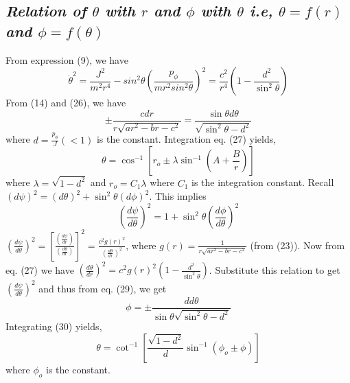 \documentclass[conference]{IEEEtran}
\begin{document}
\subsection{\emph{\textbf{Relation of $\theta$ with $r$ and $\phi$ with $\theta$ i.e, $\theta = f(r)$ and $\phi = f(\theta)$}}}
From expression (9), we have \begin{dmath}\dot{\theta}^{2} =  \frac{J^2}{m^{2}r^{4}} - sin^{2}{\theta}\left(\frac{p_{\phi}}{mr^{2}sin^{2}{\theta}}\right)^{2} = \frac{c^{2}}{r^{4}}\left(1 - \frac{d^{2}}{\sin^{2}{\theta}}\right)\end{dmath} From (14) and (26), we have \begin{dmath}\pm \frac{c dr}{r\sqrt{ar^{2} - br - c^{2}}} = \frac{\sin{\theta} d\theta}{\sqrt{\sin^{2}{\theta} - d^{2}}}\end{dmath} where $d = \frac{p_{\phi}}{J} \left( < 1\right)$ is the constant. Integration eq. (27) yields, \begin{dmath} \theta = \cos^{-1}{\left[r_{o} \pm \lambda\sin^{-1}{\left(A + \frac{B}{r}\right)}\right]}\end{dmath} where $\lambda = \sqrt{1 - d^{2}}$ and $r_{o} = C_{1}\lambda$ where $C_{1}$ is the integration constant. 
Recall $\left(d\psi\right)^{2} = \left(d\theta\right)^{2} + \sin^{2}{\theta}\left(d\phi\right)^{2}$. This implies \begin{dmath}\left(\frac{d\psi}{d \theta}\right)^{2} = 1 + \sin^{2}{\theta}\left(\frac{d\phi}{d \theta}\right)^{2}\end{dmath} 
$\left(\frac{d\psi}{d \theta}\right)^{2} = \left[\frac{\left(\frac{d\psi}{d r}\right)}{\left(\frac{d\theta}{d r}\right)}\right]^{2} = \frac{c^{2}g(r)^{2}}{\left(\frac{d\theta}{d r}\right)^{2}}$, where $g(r) = \frac{1}{r\sqrt{ar^{2} - br - c^{2}}}$ (from (23)). Now from eq. (27) we have $\left(\frac{d\theta}{d r}\right)^{2} = c^{2}g(r)^{2}\left(1 - \frac{d^{2}}{\sin^{2}{\theta}}\right)$. Substitute this relation to get $\left(\frac{d\psi}{d \theta}\right)^{2}$ and thus from eq. (29), we get \begin{dmath} \phi = \pm \frac{d  d\theta}{\sin{\theta}{\sqrt{\sin^{2}{\theta} - d^{2}}}}\end{dmath} Integrating (30) yields, \begin{equation}\theta = \cot^{-1}{\left[\frac{\sqrt{1 - d^{2}}}{d}\sin^{-1}{\left(\phi_{o} \pm \phi\right)}\right]}\end{equation} where $\phi_{o}$ is the constant.
\end{document}
